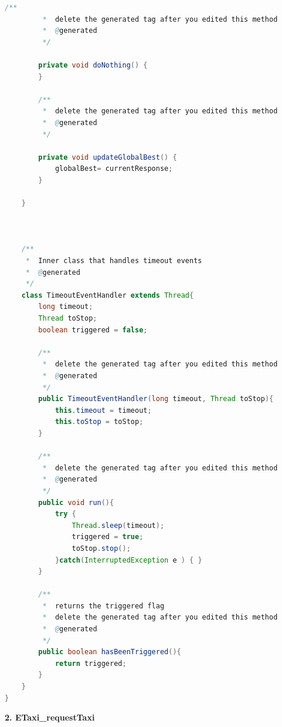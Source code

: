 \begin{lstlisting}[language=java, caption= Generated Agent Bean - MobileApplication\_requestTaxi]
		/**
	 	 *  delete the generated tag after you edited this method
		 *  @generated
		 */
		
		private void doNothing() {
		}
	 
		/**
	 	 *  delete the generated tag after you edited this method
		 *  @generated
		 */
		
		private void updateGlobalBest() {
			globalBest= currentResponse;
		}
	 
	}



	/**
	 *  Inner class that handles timeout events
	 *  @generated
	 */
	class TimeoutEventHandler extends Thread{
		long timeout;
		Thread toStop;
		boolean triggered = false;
		
		/**
		 *	delete the generated tag after you edited this method
		 *  @generated
		 */
		public TimeoutEventHandler(long timeout, Thread toStop){
			this.timeout = timeout;
			this.toStop = toStop;
		}
		
		/**
		 *	delete the generated tag after you edited this method
		 *  @generated
		 */
		public void run(){
			try {
				Thread.sleep(timeout);
				triggered = true;
				toStop.stop();
			}catch(InterruptedException e ) { }
		}
		
		/**
		 *  returns the triggered flag
		 *	delete the generated tag after you edited this method
		 *  @generated
		 */
		public boolean hasBeenTriggered(){
			return triggered;
		}
	}
}
\end{lstlisting}

\textbf{2. ETaxi\_requestTaxi}\\

